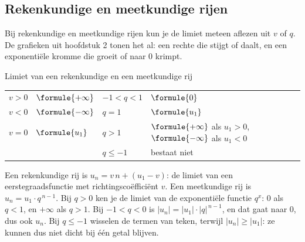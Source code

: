 

\begin{oefeningen}
\end{oefeningen}

\subsection{Rekenkundige en meetkundige rijen}

Bij rekenkundige en meetkundige rijen kun je de limiet meteen aflezen uit $v$ of $q$. De grafieken uit hoofdstuk 2 tonen het al: een rechte die stijgt of daalt, en een exponentiële kromme die groeit of naar 0 krimpt.

\begin{theorie}
\begin{stelling}{Limiet van een rekenkundige en een meetkundige rij}
{\renewcommand{\arraystretch}{1.35}%
\begin{tabular}{|>{\centering\arraybackslash}p{2.3cm}|>{\centering\arraybackslash}p{2.3cm}||>{\centering\arraybackslash}p{2.6cm}|>{\centering\arraybackslash}p{4.6cm}|}
\hline
\multicolumn{2}{|c||}{\textbf{rekenkundige rij}} & \multicolumn{2}{c|}{\textbf{meetkundige rij} ($u_1 \neq 0$)} \\ \hline
$v > 0$ & $\formule{+\infty}$ & $-1 < q < 1$ & $\formule{0}$ \\ \hline
$v < 0$ & $\formule{-\infty}$ & $q = 1$ & $\formule{u_1}$ \\ \hline
$v = 0$ & $\formule{u_1}$ & $q > 1$ & $\formule{+\infty}$ als $u_1 > 0$, $\formule{-\infty}$ als $u_1 < 0$ \\ \hline
 & & $q \leqslant -1$ & bestaat niet \\ \hline
\end{tabular}}
\end{stelling}

\begin{bewijs}
Een rekenkundige rij is $u_n = v\,n + (u_1 - v)$: de limiet van een eerstegraadsfunctie met richtingscoëfficiënt $v$. Een meetkundige rij is $u_n = u_1 \cdot q^{\,n-1}$. Bij $q > 0$ ken je de limiet van de exponentiële functie $q^x$: 0 als $q < 1$, en $+\infty$ als $q > 1$. Bij $-1 < q < 0$ is $|u_n| = |u_1| \cdot |q|^{\,n-1}$, en dat gaat naar 0, dus ook $u_n$. Bij $q \leqslant -1$ wisselen de termen van teken, terwijl $|u_n| \geqslant |u_1|$: ze kunnen dus niet dicht bij één getal blijven.
\end{bewijs}
\end{theorie}

